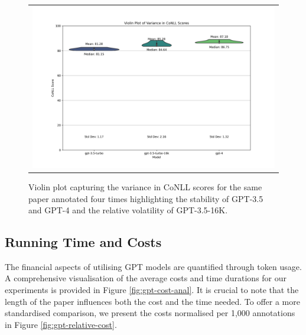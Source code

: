 \begin{figure}[ht]
  \centering
  \begin{tabular}{c}
  \includegraphics[width=14cm]{images/variance-conll.png}
  \end{tabular}
  \caption[The variance]{Violin plot capturing the variance in CoNLL scores for the same paper annotated four times highlighting the stability of GPT-3.5 and GPT-4 and the relative volatility of GPT-3.5-16K.}\label{fig:violin-variance}
\end{figure}

\subsection{Running Time and Costs}

The financial aspects of utilising GPT models are quantified through token usage. A comprehensive visualisation of the average costs and time durations for our experiments is provided in Figure \ref{fig:gpt-cost-anal}. It is crucial to note that the length of the paper influences both the cost and the time needed. To offer a more standardised comparison, we present the costs normalised per 1,000 annotations in Figure \ref{fig:gpt-relative-cost}.


